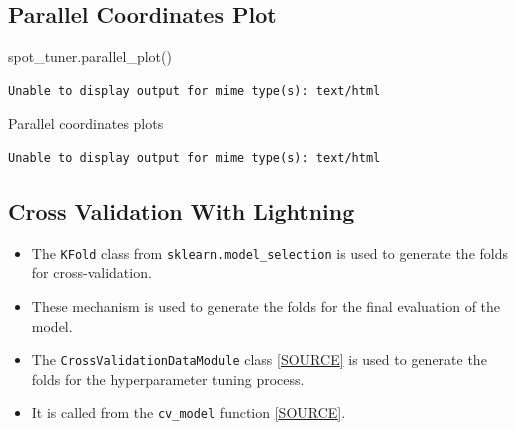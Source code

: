 \documentclass[
  letterpaper,
  DIV=11,
  numbers=noendperiod]{scrreprt}
\newenvironment{Shaded}{\begin{snugshade}}{\end{snugshade}}
\newcommand{\NormalTok}[1]{\textcolor[rgb]{0.00,0.23,0.31}{#1}}
\providecommand{\tightlist}{%
  \setlength{\itemsep}{0pt}\setlength{\parskip}{0pt}}\usepackage{longtable,booktabs,array}
\begin{document}
\subsection{Parallel Coordinates Plot}\label{parallel-coordinates-plot}

\begin{Shaded}
\begin{Highlighting}[]
\NormalTok{spot\_tuner.parallel\_plot()}
\end{Highlighting}
\end{Shaded}

\begin{verbatim}
Unable to display output for mime type(s): text/html
\end{verbatim}

Parallel coordinates plots

\begin{verbatim}
Unable to display output for mime type(s): text/html
\end{verbatim}

\subsection{Cross Validation With
Lightning}\label{cross-validation-with-lightning}

\begin{itemize}
\tightlist
\item
  The \texttt{KFold} class from \texttt{sklearn.model\_selection} is
  used to generate the folds for cross-validation.
\item
  These mechanism is used to generate the folds for the final evaluation
  of the model.
\item
  The \texttt{CrossValidationDataModule} class
  \href{https://github.com/sequential-parameter-optimization/spotPython/blob/main/src/spotPython/data/lightcrossvalidationdatamodule.py}{{[}SOURCE{]}}
  is used to generate the folds for the hyperparameter tuning process.
\item
  It is called from the \texttt{cv\_model} function
  \href{https://github.com/sequential-parameter-optimization/spotPython/blob/main/src/spotPython/light/cvmodel.py}{{[}SOURCE{]}}.
\end{itemize}
\end{document}
